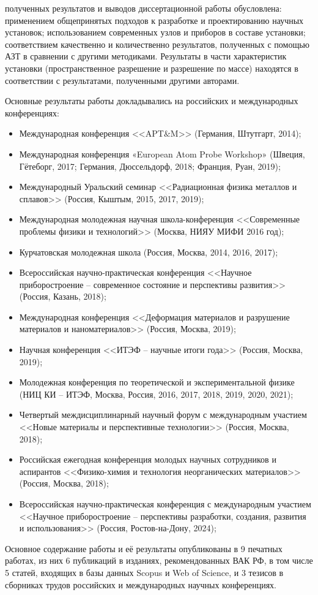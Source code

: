 {\reliability} полученных результатов и выводов диссертационной работы обусловлена: применением общепринятых подходов к разработке и проектированию научных установок; использованием современных узлов и приборов в составе установки; соответствием качественно и количественно результатов, полученных с помощью АЗТ в сравнении с другими методиками. Результаты в части характеристик установки (пространственное разрешение и разрешение по массе) находятся в соответствии с результатами, полученными другими авторами.


{\probation}
Основные результаты работы докладывались на российских и международных конференциях:
\begin{itemize}
	\item Международная конференция <<APT$\&$M>> (Германия, Штутгарт, 2014);
	\item Международная конференция «European Atom Probe Workshop» (Швеция, Гётеборг, 2017; Германия, Дюссельдорф, 2018; Франция, Руан, 2019);
	\item Международный Уральский семинар <<Радиационная физика металлов и сплавов>> (Россия, Кыштым, 2015, 2017, 2019);
	\item Международная молодежная научная школа-конференция <<Современные проблемы физики и технологий>> (Москва, НИЯУ МИФИ 2016 год);
	\item Курчатовская молодежная школа (Россия, Москва, 2014, 2016, 2017);
	\item Всероссийская научно-практическая конференция <<Научное приборостроение – современное состояние и перспективы развития>> (Россия, Казань, 2018);	
	\item Международная конференция <<Деформация материалов и разрушение материалов и наноматериалов>> (Россия, Москва, 2019); 
	\item Научная конференция <<ИТЭФ – научные итоги года>> (Россия, Москва, 2019);
	\item Молодежная конференция по теоретической и экспериментальной физике (НИЦ КИ – ИТЭФ, Москва, Россия, 2016, 2017, 2018, 2019, 2020, 2021);
	\item Четвертый междисциплинарный научный форум с международным участием <<Новые материалы и перспективные технологии>> (Россия, Москва, 2018);
	\item Российская ежегодная конференция молодых научных сотрудников и аспирантов <<Физико-химия и технология неорганических материалов>> (Россия, Москва, 2018);
	\item Всероссийская научно-практическая конференция с международным участием <<Научное приборостроение – перспективы разработки, создания, развития и использования>> (Россия, Ростов-на-Дону, 2024);
	
\end{itemize}
Основное содержание работы и её результаты опубликованы в 9 печатных работах, из них 6 публикаций в изданиях, рекомендованных ВАК РФ, в том числе 5 статей, входящих в базы данных Scopus и Web of Science, и 3 тезисов в сборниках трудов российских и международных научных конференциях.

